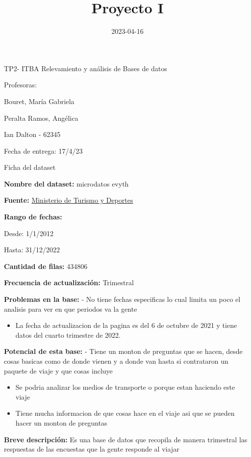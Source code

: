 \documentclass[
]{article}
\title{Proyecto I}
\author{}
\date{\vspace{-2.5em}2023-04-16}
\providecommand{\tightlist}{%
  \setlength{\itemsep}{0pt}\setlength{\parskip}{0pt}}
\begin{document}
\maketitle

TP2- ITBA Relevamiento y análisis de Bases de datos

Profesoras:

Bouret, María Gabriela

Peralta Ramos, Angélica

Ian Dalton - 62345

Fecha de entrega: 17/4/23

\newpage

Ficha del dataset

\textbf{Nombre del dataset: }microdatos evyth

\textbf{Fuente:
}\href{https://datos.gob.ar/dataset/turismo-encuesta-viajes-turismo-hogares-evyth}{Ministerio
de Turismo y Deportes}

\textbf{Rango de fechas: }

Desde: 1/1/2012

Hasta: 31/12/2022

\textbf{Cantidad de filas: }434806

\textbf{Frecuencia de actualización: } Trimestral

\textbf{Problemas en la base: } - No tiene fechas especificas lo cual
limita un poco el analisis para ver en que periodos va la gente

\begin{itemize}
\tightlist
\item
  La fecha de actualizacion de la pagina es del 6 de octubre de 2021 y
  tiene datos del cuarto trimestre de 2022.
\end{itemize}

\textbf{Potencial de esta base: } - Tiene un monton de preguntas que se
hacen, desde cosas basicas como de donde vienen y a donde van hasta si
contrataron un paquete de viaje y que cosas incluye

\begin{itemize}
\item
  Se podria analizar los medios de transporte o porque estan haciendo
  este viaje
\item
  Tiene mucha informacion de que cosas hace en el viaje asi que se
  pueden hacer un monton de preguntas
\end{itemize}

\textbf{Breve descripción: }Es una base de datos que recopila de manera
trimestral las respuestas de las encuestas que la gente responde al
viajar
\end{document}
